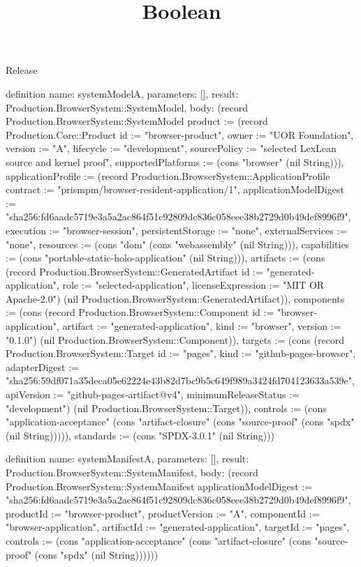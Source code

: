 \begin{lexlean}{Release}
\title{Boolean}
\begin{semanticmodule}
definition{
  name: systemModelA,
  parameters: [],
  result: Production.BrowserSystem::SystemModel,
  body: (record Production.BrowserSystem::SystemModel {product := (record Production.Core::Product {id := "browser-product", owner := "UOR Foundation", version := "A", lifecycle := "development", sourcePolicy := "selected LexLean source and kernel proof", supportedPlatforms := (cons "browser" (nil String))}), applicationProfile := (record Production.BrowserSystem::ApplicationProfile {contract := "prismpm/browser-resident-application/1", applicationModelDigest := "sha256:fd6aadc5719e3a5a2ac864f51c92809dc836c058eee38b2729d0b49def8996f9", execution := "browser-session", persistentStorage := "none", externalServices := "none", resources := (cons "dom" (cons "webassembly" (nil String))), capabilities := (cons "portable-static-holo-application" (nil String))}), artifacts := (cons (record Production.BrowserSystem::GeneratedArtifact {id := "generated-application", role := "selected-application", licenseExpression := "MIT OR Apache-2.0"}) (nil Production.BrowserSystem::GeneratedArtifact)), components := (cons (record Production.BrowserSystem::Component {id := "browser-application", artifact := "generated-application", kind := "browser", version := "0.1.0"}) (nil Production.BrowserSystem::Component)), targets := (cons (record Production.BrowserSystem::Target {id := "pages", kind := "github-pages-browser", adapterDigest := "sha256:59df071a35deca05e62224e43b82d7bc9b5c649f989a3424fd704123633a539e", apiVersion := "github-pages-artifact@v4", minimumReleaseStatus := "development"}) (nil Production.BrowserSystem::Target)), controls := (cons "application-acceptance" (cons "artifact-closure" (cons "source-proof" (cons "spdx" (nil String))))), standards := (cons "SPDX-3.0.1" (nil String))})
}

definition{
  name: systemManifestA,
  parameters: [],
  result: Production.BrowserSystem::SystemManifest,
  body: (record Production.BrowserSystem::SystemManifest {applicationModelDigest := "sha256:fd6aadc5719e3a5a2ac864f51c92809dc836c058eee38b2729d0b49def8996f9", productId := "browser-product", productVersion := "A", componentId := "browser-application", artifactId := "generated-application", targetId := "pages", controls := (cons "application-acceptance" (cons "artifact-closure" (cons "source-proof" (cons "spdx" (nil String)))))})
}


\end{semanticmodule}
\end{lexlean}
